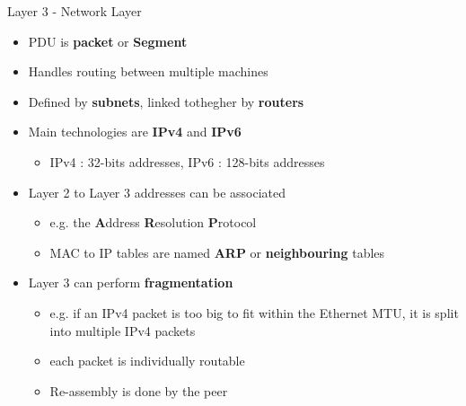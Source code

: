 \begin{frame}{Layer 3 - Network Layer}
	\begin{itemize}
		\item PDU is \textbf{packet} or \textbf{Segment}
		\item Handles routing between multiple machines
		\item Defined by \textbf{subnets}, linked tothegher by \textbf{routers}
		\item Main technologies are \textbf{IPv4} and \textbf{IPv6}
			\begin{itemize}
				\item IPv4 : 32-bits addresses, IPv6 : 128-bits addresses
			\end{itemize}
		\item Layer 2 to Layer 3 addresses can be associated
			\begin{itemize}
				\item e.g. the \textbf{A}ddress \textbf{R}esolution \textbf{P}rotocol
				\item MAC to IP tables are named \textbf{ARP} or \textbf{neighbouring} tables
			\end{itemize}
		\item Layer 3 can perform \textbf{fragmentation}
			\begin{itemize}
				\item e.g. if an IPv4 packet is too big to fit within the Ethernet MTU, it is split into multiple IPv4 packets
				\item each packet is individually routable
				\item Re-assembly is done by the peer
			\end{itemize}
	\end{itemize}
\end{frame}

